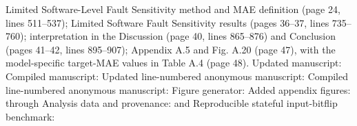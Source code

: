 {} Limited Software-Level Fault Sensitivity method and MAE definition (page 24, lines 511--537); Limited Software Fault Sensitivity results (pages 36--37, lines 735--760); interpretation in the Discussion (page 40, lines 865--876) and Conclusion (pages 41--42, lines 895--907); Appendix A.5 and Fig. A.20 (page 47), with the model-specific target-MAE values in Table A.4 (page 48).\markdownRendererInterblockSeparator
{}
\markdownRendererSectionEnd \markdownRendererSectionBegin
{}\markdownRendererInterblockSeparator
{}\markdownRendererUlBeginTight
\markdownRendererUlItem Updated manuscript: \markdownRendererUlItemEnd 
\markdownRendererUlItem Compiled manuscript: \markdownRendererUlItemEnd 
\markdownRendererUlItem Updated line-numbered anonymous manuscript: \markdownRendererUlItemEnd 
\markdownRendererUlItem Compiled line-numbered anonymous manuscript: \markdownRendererUlItemEnd 
\markdownRendererUlItem Figure generator: \markdownRendererUlItemEnd 
\markdownRendererUlItem Added appendix figures:  through \markdownRendererUlItemEnd 
\markdownRendererUlItem Analysis data and provenance:  and \markdownRendererUlItemEnd 
\markdownRendererUlItem Reproducible stateful input-bitflip benchmark: \markdownRendererUlItemEnd 
\markdownRendererUlEndTight 
\markdownRendererSectionEnd 
\markdownRendererSectionEnd \markdownRendererDocumentEnd